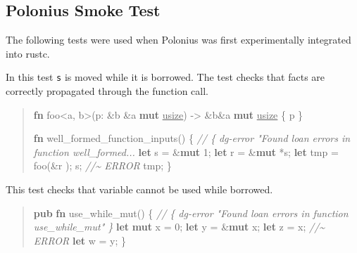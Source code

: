 \documentclass[
  11pt,
  twoside]{report}
\newenvironment{Shaded}{}{}
\newcommand{\CommentTok}[1]{\textit{#1}}
\newcommand{\DataTypeTok}[1]{\underline{#1}}
\newcommand{\DecValTok}[1]{#1}
\newcommand{\KeywordTok}[1]{\textbf{#1}}
\newcommand{\NormalTok}[1]{#1}
\newcommand{\OperatorTok}[1]{#1}
\newcommand{\OtherTok}[1]{#1}
\begin{document}
\subsection{Polonius Smoke Test}\label{sec:polonius-smoke-test}

The following tests were used when Polonius was first experimentally
integrated into rustc.

In this test \texttt{s} is moved while it is borrowed. The test checks
that facts are correctly propagated through the function call.

\begin{quote}
\begin{Shaded}
\begin{Highlighting}[]
\KeywordTok{fn}\NormalTok{ foo}\OperatorTok{\textless{}}\OtherTok{\textquotesingle{}a}\OperatorTok{,} \OtherTok{\textquotesingle{}b}\OperatorTok{\textgreater{}}\NormalTok{(p}\OperatorTok{:} \OperatorTok{\&}\OtherTok{\textquotesingle{}b} \OperatorTok{\&}\OtherTok{\textquotesingle{}a} \KeywordTok{mut} \DataTypeTok{usize}\NormalTok{) }\OperatorTok{{-}\textgreater{}} \OperatorTok{\&}\OtherTok{\textquotesingle{}b}\OperatorTok{\&}\OtherTok{\textquotesingle{}a} \KeywordTok{mut} \DataTypeTok{usize} \OperatorTok{\{}
\NormalTok{    p}
\OperatorTok{\}}

\KeywordTok{fn}\NormalTok{ well\_formed\_function\_inputs() }\OperatorTok{\{}
    \CommentTok{// \{ dg{-}error "Found loan errors in function well\_formed...}
    \KeywordTok{let}\NormalTok{ s }\OperatorTok{=} \OperatorTok{\&}\KeywordTok{mut} \DecValTok{1}\OperatorTok{;}
    \KeywordTok{let}\NormalTok{ r }\OperatorTok{=} \OperatorTok{\&}\KeywordTok{mut} \OperatorTok{*}\NormalTok{s}\OperatorTok{;}
    \KeywordTok{let}\NormalTok{ tmp }\OperatorTok{=}\NormalTok{ foo(}\OperatorTok{\&}\NormalTok{r  )}\OperatorTok{;}
\NormalTok{    s}\OperatorTok{;} \CommentTok{//\textasciitilde{} ERROR}
\NormalTok{    tmp}\OperatorTok{;}
\OperatorTok{\}}
\end{Highlighting}
\end{Shaded}
\end{quote}

This test checks that variable cannot be used while borrowed.

\begin{quote}
\begin{Shaded}
\begin{Highlighting}[]
\KeywordTok{pub} \KeywordTok{fn}\NormalTok{ use\_while\_mut() }\OperatorTok{\{}
    \CommentTok{// \{ dg{-}error "Found loan errors in function use\_while\_mut" \}}
    \KeywordTok{let} \KeywordTok{mut}\NormalTok{ x }\OperatorTok{=} \DecValTok{0}\OperatorTok{;}
    \KeywordTok{let}\NormalTok{ y }\OperatorTok{=} \OperatorTok{\&}\KeywordTok{mut}\NormalTok{ x}\OperatorTok{;}
    \KeywordTok{let}\NormalTok{ z }\OperatorTok{=}\NormalTok{ x}\OperatorTok{;} \CommentTok{//\textasciitilde{} ERROR}
    \KeywordTok{let}\NormalTok{ w }\OperatorTok{=}\NormalTok{ y}\OperatorTok{;}
\OperatorTok{\}}
\end{Highlighting}
\end{Shaded}
\end{quote}
\end{document}

